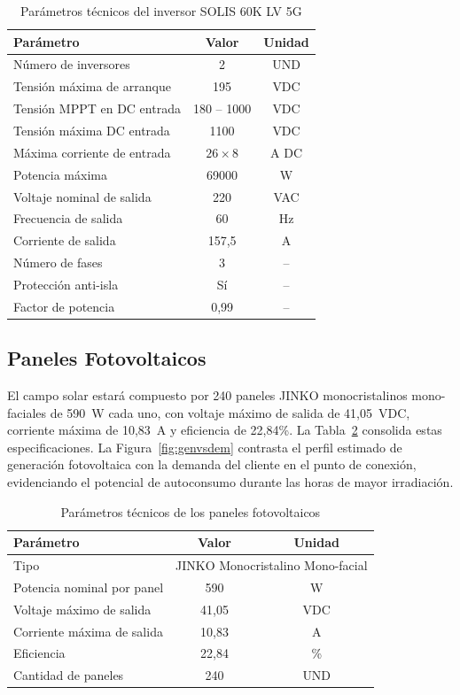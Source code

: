 \begin{table}[H]
    \centering
    \caption{Parámetros técnicos del inversor SOLIS 60K LV 5G}
    \label{tab:inversores}
    \begin{tabular}{lcc}
    \toprule
    \textbf{Parámetro} & \textbf{Valor} & \textbf{Unidad} \\
    \midrule
    Número de inversores & 2 & UND \\
    Tensión máxima de arranque & 195 & VDC \\
    Tensión MPPT en DC entrada & 180 -- 1000 & VDC \\
    Tensión máxima DC entrada & 1100 & VDC \\
    Máxima corriente de entrada & $26 \times 8$ & A DC \\
    Potencia máxima & 69000 & W \\
    Voltaje nominal de salida & 220 & VAC \\
    Frecuencia de salida & 60 & Hz \\
    Corriente de salida & 157,5 & A \\
    Número de fases & 3 & -- \\
    Protección anti-isla & Sí & -- \\
    Factor de potencia & 0,99 & -- \\
    \bottomrule
    \end{tabular}
\end{table}

\subsection{Paneles Fotovoltaicos}

El campo solar estará compuesto por 240 paneles JINKO monocristalinos mono-faciales de 590~W cada uno, con voltaje máximo de salida de 41,05~VDC, corriente máxima de 10,83~A y eficiencia de 22,84\%. La Tabla~\ref{tab:paneles} consolida estas especificaciones. La Figura~\ref{fig:genvsdem} contrasta el perfil estimado de generación fotovoltaica con la demanda del cliente en el punto de conexión, evidenciando el potencial de autoconsumo durante las horas de mayor irradiación.

\begin{table}[H]
    \centering
    \caption{Parámetros técnicos de los paneles fotovoltaicos}
    \label{tab:paneles}
    \begin{tabular}{lcc}
    \toprule
    \textbf{Parámetro} & \textbf{Valor} & \textbf{Unidad} \\
    \midrule
    Tipo & \multicolumn{2}{l}{JINKO Monocristalino Mono-facial} \\
    Potencia nominal por panel & 590 & W \\
    Voltaje máximo de salida & 41,05 & VDC \\
    Corriente máxima de salida & 10,83 & A \\
    Eficiencia & 22,84 & \% \\
    Cantidad de paneles & 240 & UND \\
    \bottomrule
    \end{tabular}
\end{table}

